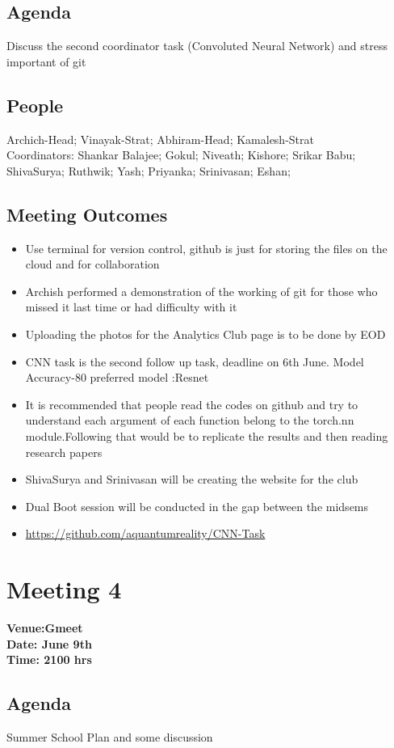 \documentclass[11pt]{scrartcl}
\begin{document}
\subsection{Agenda}
Discuss the second coordinator task (Convoluted Neural Network) and stress important of git
\subsection{People}
Archich-Head;
Vinayak-Strat;
Abhiram-Head;
Kamalesh-Strat\\
Coordinators:
Shankar Balajee;
Gokul;
Niveath;
Kishore;
Srikar Babu;
ShivaSurya;
Ruthwik;
Yash;
Priyanka;
Srinivasan;
Eshan;
\subsection{Meeting Outcomes}
\begin{itemize}
    \item Use terminal for version control, github is just for storing the files on the cloud and for collaboration
    \item Archish performed a demonstration of the working of git for those who missed it last time or had difficulty with it
    \item Uploading the photos for the Analytics Club page is to be done by EOD
    \item CNN task is the second follow up task, deadline on 6th June. Model Accuracy-80 %
    preferred model :Resnet
    \item It is recommended that people read the codes on github and try to understand each argument of each function belong to the torch.nn module.Following that would be to replicate the results and then reading research papers
    \item ShivaSurya and Srinivasan will be creating the website for the club 
    \item Dual Boot session will be conducted in the gap between the midsems
    \item \url{https://github.com/aquantumreality/CNN-Task}
\end{itemize}
\section{Meeting 4}
\textbf{Venue:Gmeet}\\
\textbf{Date: June 9th}\\
\textbf{Time: 2100 hrs}\\
\subsection{Agenda}
Summer School Plan and some discussion
\end{document}
